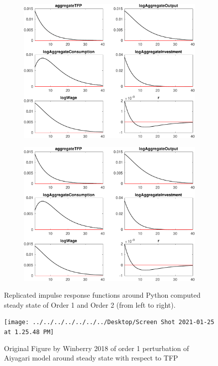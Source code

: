 \documentclass[11pt]{article}
\begin{document}
\begin{figure}[htp]
\begin{subfigure}{.5\textwidth}
\centering	
\includegraphics[scale=.33]{../Figures/dynamics_polynomials_IRF_aggregateTFPShock.pdf}
\end{subfigure}
\begin{subfigure}{.5\textwidth}
\centering
\includegraphics[scale=.355]{../Figures/dynamics_polynomials_IRF_aggregateTFPShock_second_order.pdf}
\end{subfigure}
\caption{Replicated impulse response functions around Python computed steady state of Order 1 and Order 2 (from left to right).}
\label{IRF_rep}
\vspace*{\floatsep}
\centering
\texttt{[image: ../../../../../../../Desktop/Screen Shot 2021-01-25 at 1.25.48 PM]}
\caption{Original Figure by Winberry 2018 of order 1 perturbation of Aiyagari model around steady state with respect to TFP}
\label{IRF_orig}
\end{figure}
\end{document}
